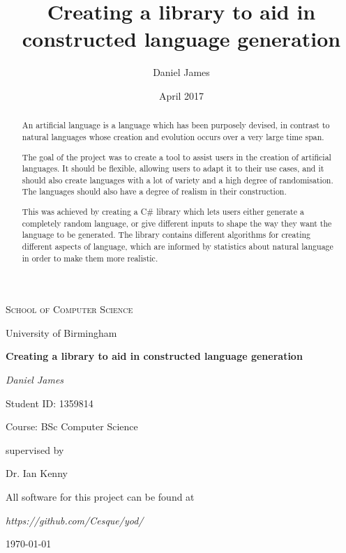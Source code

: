 \documentclass{report}
\title{Creating a library to aid in constructed language generation}
\author{Daniel James}
\date{April 2017}
\newcommand{\Csh}{C{\lserif\#}}
\begin{document}
	\begin{titlepage}
	  	\centering
	  	{\scshape\LARGE School of Computer Science\par University of Birmingham \par}
	  	\vspace{4cm}
	  	{\huge\bfseries Creating a library to aid in constructed language generation\par}
	  	\vspace{0cm}
	  	{\Large\itshape Daniel James\par}
	  	{\small Student ID: 1359814\par}
	  	{\small Course: BSc Computer Science\par}
	  	\vfill
	  	supervised by\par
	  	Dr. Ian Kenny
	  	
	  	\vspace{0.8cm}
	  		
	  	All software for this project can be found at\par\textit{https://github.com/Cesque/yod/}\par
	  	\vspace{0.8cm}
	  	{\large \today\par}
	\end{titlepage}
	
	\begin{abstract}
		An artificial language is a language which has been purposely devised, in contrast to natural languages whose creation and evolution occurs over a very large time span.
		
		The goal of the project was to create a tool to assist users in the creation of artificial languages. It should be flexible, allowing users to adapt it to their use cases, and it should also create languages with a lot of variety and a high degree of randomisation. The languages should also have a degree of realism in their construction.
		
		This was achieved by creating a \Csh{} library which lets users either generate a completely random language, or give different inputs to shape the way they want the language to be generated. The library contains different algorithms for creating different aspects of language, which are informed by statistics about natural language in order to make them more realistic.
	\end{abstract}
	
	\tableofcontents
	
	\listoffigures
	
\end{document}
